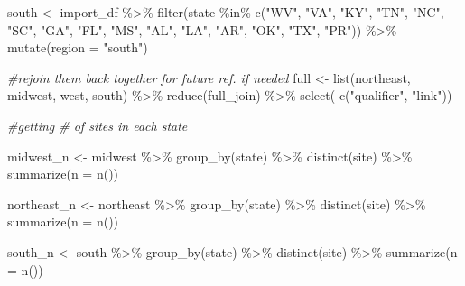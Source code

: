 \documentclass[12pt, twoside]{amherstthesis}
\newenvironment{Shaded}{\begin{snugshade}}{\end{snugshade}}
\newcommand{\AttributeTok}[1]{\textcolor[rgb]{0.77,0.63,0.00}{#1}}
\newcommand{\CommentTok}[1]{\textcolor[rgb]{0.56,0.35,0.01}{\textit{#1}}}
\newcommand{\FunctionTok}[1]{\textcolor[rgb]{0.00,0.00,0.00}{#1}}
\newcommand{\NormalTok}[1]{#1}
\newcommand{\OtherTok}[1]{\textcolor[rgb]{0.56,0.35,0.01}{#1}}
\newcommand{\SpecialCharTok}[1]{\textcolor[rgb]{0.00,0.00,0.00}{#1}}
\newcommand{\StringTok}[1]{\textcolor[rgb]{0.31,0.60,0.02}{#1}}
\begin{document}
\begin{Shaded}
\begin{Highlighting}[]
\NormalTok{south }\OtherTok{\textless{}{-}}\NormalTok{ import\_df }\SpecialCharTok{\%\textgreater{}\%}
  \FunctionTok{filter}\NormalTok{(state }\SpecialCharTok{\%in\%} \FunctionTok{c}\NormalTok{(}\StringTok{"WV"}\NormalTok{, }\StringTok{"VA"}\NormalTok{, }\StringTok{"KY"}\NormalTok{, }\StringTok{"TN"}\NormalTok{, }\StringTok{"NC"}\NormalTok{, }\StringTok{"SC"}\NormalTok{, }\StringTok{"GA"}\NormalTok{, }
                      \StringTok{"FL"}\NormalTok{, }\StringTok{"MS"}\NormalTok{, }\StringTok{"AL"}\NormalTok{, }\StringTok{"LA"}\NormalTok{, }\StringTok{"AR"}\NormalTok{, }\StringTok{"OK"}\NormalTok{, }\StringTok{"TX"}\NormalTok{, }
                      \StringTok{"PR"}\NormalTok{)) }\SpecialCharTok{\%\textgreater{}\%}
  \FunctionTok{mutate}\NormalTok{(}\AttributeTok{region =} \StringTok{"south"}\NormalTok{)}

\CommentTok{\#rejoin them back together for future ref. if needed}
\NormalTok{full }\OtherTok{\textless{}{-}} \FunctionTok{list}\NormalTok{(northeast, midwest, west, south) }\SpecialCharTok{\%\textgreater{}\%} 
  \FunctionTok{reduce}\NormalTok{(full\_join) }\SpecialCharTok{\%\textgreater{}\%}
  \FunctionTok{select}\NormalTok{(}\SpecialCharTok{{-}}\FunctionTok{c}\NormalTok{(}\StringTok{"qualifier"}\NormalTok{, }\StringTok{"link"}\NormalTok{))}

\CommentTok{\#getting \# of sites in each state}

\NormalTok{midwest\_n }\OtherTok{\textless{}{-}}\NormalTok{ midwest }\SpecialCharTok{\%\textgreater{}\%}
  \FunctionTok{group\_by}\NormalTok{(state) }\SpecialCharTok{\%\textgreater{}\%}
  \FunctionTok{distinct}\NormalTok{(site) }\SpecialCharTok{\%\textgreater{}\%}
  \FunctionTok{summarize}\NormalTok{(}\AttributeTok{n =} \FunctionTok{n}\NormalTok{())}

\NormalTok{northeast\_n }\OtherTok{\textless{}{-}}\NormalTok{ northeast }\SpecialCharTok{\%\textgreater{}\%}
  \FunctionTok{group\_by}\NormalTok{(state) }\SpecialCharTok{\%\textgreater{}\%}
  \FunctionTok{distinct}\NormalTok{(site) }\SpecialCharTok{\%\textgreater{}\%}
  \FunctionTok{summarize}\NormalTok{(}\AttributeTok{n =} \FunctionTok{n}\NormalTok{())}

\NormalTok{south\_n }\OtherTok{\textless{}{-}}\NormalTok{ south }\SpecialCharTok{\%\textgreater{}\%}
  \FunctionTok{group\_by}\NormalTok{(state) }\SpecialCharTok{\%\textgreater{}\%}
  \FunctionTok{distinct}\NormalTok{(site) }\SpecialCharTok{\%\textgreater{}\%}
  \FunctionTok{summarize}\NormalTok{(}\AttributeTok{n =} \FunctionTok{n}\NormalTok{())}


\end{Highlighting}
\end{Shaded}
\end{document}
